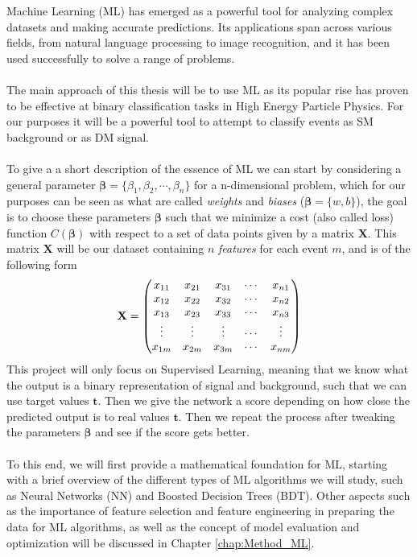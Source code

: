 \documentclass[12pt, a4paper]{book}
\begin{document}
Machine Learning (ML) has emerged as a powerful tool for analyzing complex datasets and making accurate predictions. Its applications span across various fields, from natural language processing to image recognition, and it has been used successfully to solve a range of problems. \\
\\The main approach of this thesis will be to use ML as its popular rise has proven to be effective at binary classification tasks \cite{Baldi_2016, DeepLearing} in High Energy Particle Physics. 
For our purposes it will be a powerful tool to attempt to classify events as SM background or as DM signal.\\
\\To give a a short description of the essence of ML we can start by considering a general parameter $\bm{\beta} = \{\beta_1,\beta_2,\cdots,\beta_n\}$ for a n-dimensional problem, which for our purposes can be seen as what are called \textit{weights} and \textit{biases} 
($\bm \beta = \{w, b\}$), 
the goal is to choose these parameters $\bm{\beta}$ such that we minimize a cost (also called loss) function $C(\bm{\beta})$ with respect to a set of data points given by a matrix $\mathbf{X}$. This matrix $\mathbf{X}$ will be 
our dataset containing $n$ \textit{features} for each event $m$, and is of the following form 
\begin{equation}\label{eq:dataset}
    \bf X = \begin{pmatrix}
        x_{11} & x_{21} & x_{31} & \cdots & x_{n1}\\
        x_{12} & x_{22} & x_{32} & \cdots & x_{n2}\\
        x_{13} & x_{23} & x_{33} & \cdots & x_{n3}\\
        \vdots & \vdots & \vdots & \cdots & \vdots\\
        x_{1m} & x_{2m} & x_{3m} & \cdots & x_{nm}\\  
    \end{pmatrix}    
\end{equation}
This project will only focus on Supervised Learning, meaning that we know what the output is a binary representation of signal and background, such that we can use target values $\bm{t}$. 
Then we give the network a score depending on how close the predicted output is to real values $\bm t $. Then we repeat the process after tweaking the parameters $\bm \beta $ and see if the score gets better.\\
\\To this end, we will first provide a mathematical foundation for ML, starting with a brief overview of the different types of ML algorithms we will study, such as Neural Networks (NN) and Boosted Decision Trees (BDT). 
Other aspects such as the importance of feature selection and feature engineering in preparing the data for ML algorithms, as well as the concept of model evaluation and optimization will be discussed in Chapter \ref{chap:Method_ML}.
\end{document}

